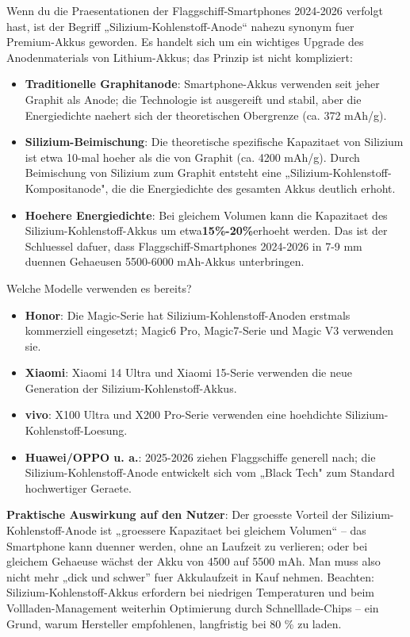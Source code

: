 
Wenn du die Praesentationen der Flaggschiff-Smartphones 2024-2026 verfolgt hast, ist der Begriff „Silizium-Kohlenstoff-Anode“ nahezu synonym fuer Premium-Akkus geworden. Es handelt sich um ein wichtiges Upgrade des Anodenmaterials von Lithium-Akkus; das Prinzip ist nicht kompliziert:

\begin{itemize}
  \item \textbf{Traditionelle Graphitanode}: Smartphone-Akkus verwenden seit jeher Graphit als Anode; die Technologie ist ausgereift und stabil, aber die Energiedichte naehert sich der theoretischen Obergrenze (ca. 372 mAh/g).
  \item \textbf{Silizium-Beimischung}: Die theoretische spezifische Kapazitaet von Silizium ist etwa 10-mal hoeher als die von Graphit (ca. 4200 mAh/g). Durch Beimischung von Silizium zum Graphit entsteht eine „Silizium-Kohlenstoff-Kompositanode", die die Energiedichte des gesamten Akkus deutlich erhoht.
  \item \textbf{Hoehere Energiedichte}: Bei gleichem Volumen kann die Kapazitaet des Silizium-Kohlenstoff-Akkus um etwa\textbf{15\%-20\%}erhoeht werden. Das ist der Schluessel dafuer, dass Flaggschiff-Smartphones 2024-2026 in 7-9 mm duennen Gehaeusen 5500-6000 mAh-Akkus unterbringen.
\end{itemize}

\begin{tcbinfo}{Welche Modelle verwenden es bereits?}
\begin{itemize}
  \item \textbf{Honor}: Die Magic-Serie hat Silizium-Kohlenstoff-Anoden erstmals kommerziell eingesetzt; Magic6 Pro, Magic7-Serie und Magic V3 verwenden sie.
  \item \textbf{Xiaomi}: Xiaomi 14 Ultra und Xiaomi 15-Serie verwenden die neue Generation der Silizium-Kohlenstoff-Akkus.
  \item \textbf{vivo}: X100 Ultra und X200 Pro-Serie verwenden eine hoehdichte Silizium-Kohlenstoff-Loesung.
  \item \textbf{Huawei/OPPO u. a.}: 2025-2026 ziehen Flaggschiffe generell nach; die Silizium-Kohlenstoff-Anode entwickelt sich vom „Black Tech" zum Standard hochwertiger Geraete.
\end{itemize}

\end{tcbinfo}

\textbf{Praktische Auswirkung auf den Nutzer}: Der groesste Vorteil der Silizium-Kohlenstoff-Anode ist „groessere Kapazitaet bei gleichem Volumen“ – das Smartphone kann duenner werden, ohne an Laufzeit zu verlieren; oder bei gleichem Gehaeuse wächst der Akku von 4500 auf 5500 mAh. Man muss also nicht mehr „dick und schwer” fuer Akkulaufzeit in Kauf nehmen. Beachten: Silizium-Kohlenstoff-Akkus erfordern bei niedrigen Temperaturen und beim Vollladen-Management weiterhin Optimierung durch Schnelllade-Chips – ein Grund, warum Hersteller empfohlenen, langfristig bei 80 \% zu laden.

